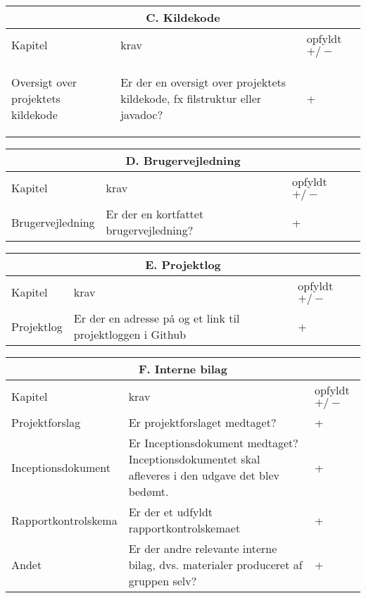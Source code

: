 \newpage
\begin{center}
\begin{longtable}{|m{3.5cm}|m{10cm}|m{2.5cm}|}
\hline
\multicolumn{3}{|c|}{C. Kildekode} \\ \hline
Kapitel & krav & opfyldt $+/-$ \\ \hline
\begin{flushleft} 
Oversigt over projektets kildekode
\end{flushleft} 
& Er der en oversigt over projektets kildekode, fx filstruktur eller javadoc? & +\\ \hline
\end{longtable}
\end{center}

\begin{center}
\begin{longtable}{|m{3.5cm}|m{10cm}|m{2.5cm}|}
\hline
\multicolumn{3}{|c|}{D. Brugervejledning} \\ \hline
Kapitel & krav & opfyldt $+/-$ \\ \hline
Brugervejledning & Er der en kortfattet brugervejledning? & +\\ \hline

\end{longtable}
\end{center}

\begin{center}
\begin{longtable}{|m{3.5cm}|m{10cm}|m{2.5cm}|}
\hline
\multicolumn{3}{|c|}{E. Projektlog} \\ \hline
Kapitel & krav & opfyldt $+/-$ \\ \hline
Projektlog & Er der en adresse på og et link til projektloggen i Github & +\\ \hline
\end{longtable}
\end{center}

\begin{center}
\begin{longtable}{|m{3.5cm}|m{10cm}|m{2.5cm}|}
\hline
\multicolumn{3}{|c|}{F. Interne bilag} \\ \hline
Kapitel & krav & opfyldt $+/-$ \\ \hline
Projektforslag & Er projektforslaget medtaget? & +\\ \hline
Inceptionsdokument & Er Inceptionsdokument medtaget? Inceptionsdokumentet skal afleveres i den udgave det blev bedømt. & +\\  \hline
Rapportkontrolskema & Er der et udfyldt rapportkontrolskemaet & +\\ \hline
Andet & Er der andre relevante interne bilag, dvs. materialer produceret af gruppen selv? & +\\ \hline
\end{longtable}
\end{center}

